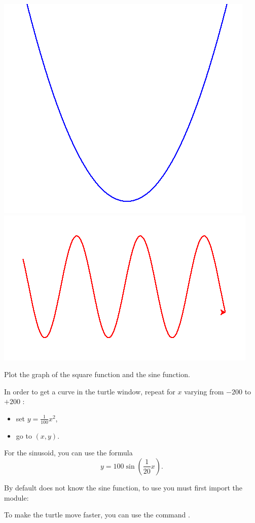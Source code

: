 \documentclass[11pt,class=report,crop=false]{standalone}
\begin{document}

\begin{activite}


\begin{center}
\includegraphics[scale=\myscale,scale=0.4]{screen-turtle-3a}
\includegraphics[scale=\myscale,scale=0.4]{screen-turtle-3b}
\end{center}

Plot the graph of the square function and the sine function.

In order to get a curve in the turtle window, repeat for $x$ varying from $-200$ to $+200$ :
\begin{itemize}
  \item set $y = \frac{1}{100} x^2$,
  \item go to $(x,y)$.
\end{itemize}

For the sinusoid, you can use the formula 
$$y = 100\sin\left(\frac{1}{20}x\right).$$
  
By default \Python{} does not know the sine function, to use  you must first import the  module:

To make the turtle move faster, you can use the command .
\end{activite}
\end{document}
